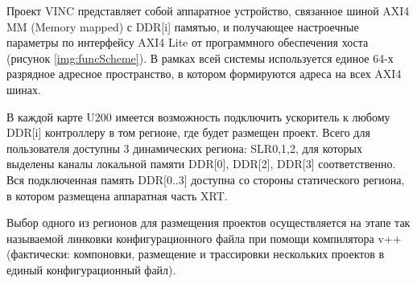 Проект VINC представляет собой аппаратное устройство, связанное шиной AXI4 MM
(Memory mapped) с DDR[i] памятью, и получающее настроечные параметры по
интерфейсу AXI4 Lite от программного обеспечения хоста (рисунок
\ref{img:funcScheme}). В рамках всей системы используется единое 64-х разрядное
адресное пространство, в котором формируются адреса на всех AXI4 шинах.


В каждой карте U200 имеется возможность подключить ускоритель к любому DDR[i]
контроллеру в том регионе, где будет размещен проект. Всего для пользователя
доступны 3 динамических региона: SLR0,1,2, для которых выделены каналы
локальной памяти DDR[0], DDR[2], DDR[3] соответственно. Вся подключенная память
DDR[0..3] доступна со стороны статического региона, в котором размещена
аппаратная часть XRT.

Выбор одного из регионов для размещения проектов осуществляется на этапе так
называемой линковки конфигурационного файла при помощи компилятора
v++(фактически: компоновки, размещение и трассировки нескольких проектов в
единый конфигурационный файл).
